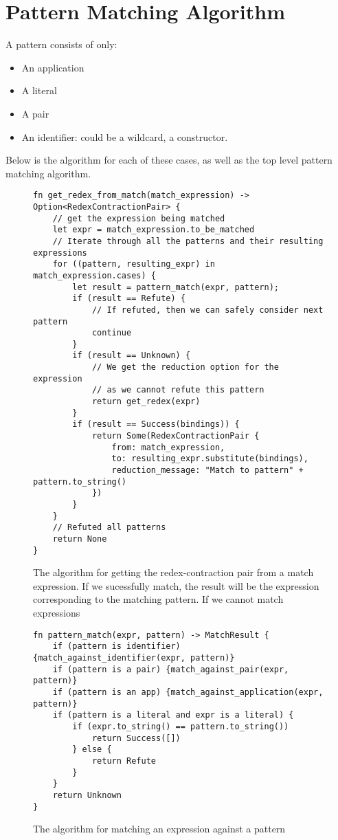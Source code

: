 \chapter{Pattern Matching Algorithm}
\label{appx:pattern_match}
A pattern consists of only:
\begin{itemize}
    \item An application
    \item A literal
    \item A pair
    \item An identifier: could be a wildcard, a constructor.
\end{itemize}

Below is the algorithm for each of these cases, as well as the top level pattern matching algorithm. 

\begin{figure}[h]
    \begin{lstlisting}[language=Rust_boxed]
fn get_redex_from_match(match_expression) -> Option<RedexContractionPair> {
    // get the expression being matched
    let expr = match_expression.to_be_matched
    // Iterate through all the patterns and their resulting expressions
    for ((pattern, resulting_expr) in match_expression.cases) {
        let result = pattern_match(expr, pattern);
        if (result == Refute) {
            // If refuted, then we can safely consider next pattern
            continue
        }
        if (result == Unknown) {
            // We get the reduction option for the expression
            // as we cannot refute this pattern
            return get_redex(expr)
        }
        if (result == Success(bindings)) {
            return Some(RedexContractionPair {
                from: match_expression,
                to: resulting_expr.substitute(bindings),
                reduction_message: "Match to pattern" + pattern.to_string()
            })
        }
    }
    // Refuted all patterns
    return None
}
\end{lstlisting}
    \caption{The algorithm for getting the redex-contraction pair from a match expression. If we sucessfully match, the result will be the expression corresponding to the matching pattern. If we cannot match expressions}
    \label{fig:all_pattern_list_iterate}
\end{figure}

\begin{figure}[h]
    \begin{lstlisting}[language=Rust_boxed]
fn pattern_match(expr, pattern) -> MatchResult {
    if (pattern is identifier) {match_against_identifier(expr, pattern)}
    if (pattern is a pair) {match_against_pair(expr, pattern)}
    if (pattern is an app) {match_against_application(expr, pattern)}
    if (pattern is a literal and expr is a literal) {
        if (expr.to_string() == pattern.to_string()) 
            return Success([])
        } else {
            return Refute
        }
    }
    return Unknown
}
\end{lstlisting}
    \caption{The algorithm for matching an expression against a pattern}
    \label{fig:pattern_list_top_level}
\end{figure}

